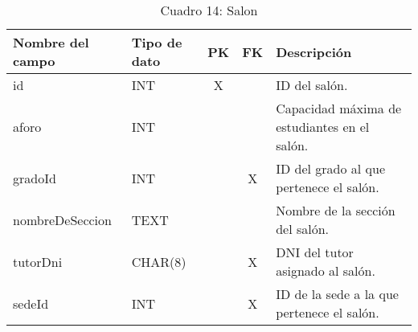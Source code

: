 \begin{table}[H]
	\centering
	\begin{tabular}{|l|l|c|c|l|}
		\hline
		\textbf{Nombre del campo} & \textbf{Tipo de dato} & \textbf{PK} & \textbf{FK} & \textbf{Descripción}                         \\
		\hline
		id                        & INT                   & X           &             & ID del salón.                                \\
		\hline
		aforo                     & INT                   &             &             & Capacidad máxima de estudiantes en el salón. \\
		\hline
		gradoId                   & INT                   &             & X           & ID del grado al que pertenece el salón.      \\
		\hline
		nombreDeSeccion           & TEXT                  &             &             & Nombre de la sección del salón.              \\
		\hline
		tutorDni                  & CHAR(8)               &             & X           & DNI del tutor asignado al salón.             \\
		\hline
		sedeId                    & INT                   &             & X           & ID de la sede a la que pertenece el salón.   \\
		\hline
	\end{tabular}
	\caption{Cuadro 14: Salon}
\end{table}